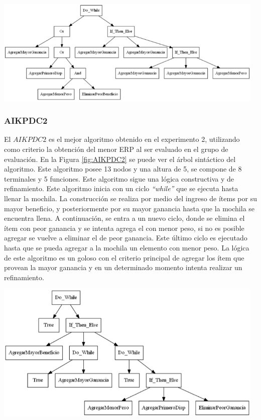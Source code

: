 \begingroup
    \centering
    \includegraphics[width=13cm]{images/cap6/ANKPNC4.png}
    \label{fig:ANKPNC4}
\endgroup

\subsubsection{AIKPDC2}

El $AIKPDC2$ es el mejor algoritmo obtenido en el experimento 2, utilizando como criterio la obtención del menor ERP al ser evaluado en el grupo de evaluación. En la Figura \ref{fig:AIKPDC2} se puede ver el árbol sintáctico del algoritmo. Este algoritmo posee 13 nodos y una altura de 5, se compone de 8 terminales y 5 funciones. Este algoritmo sigue una lógica constructiva y de refinamiento.
Este algoritmo inicia con un ciclo \textit{“while”} que se ejecuta hasta llenar la mochila. La construcción se realiza por medio del ingreso de ítems por su mayor beneficio, y posteriormente por su mayor ganancia hasta que la mochila se encuentra llena. A continuación, se entra a un nuevo ciclo, donde se elimina el ítem con peor ganancia y se intenta agrega el con menor peso, si no es posible agregar se vuelve a eliminar el de peor ganancia. Este último ciclo es ejecutado hasta que se pueda agregar a la mochila un elemento con menor peso. La lógica de este algoritmo es un goloso con el criterio principal de agregar los ítem que provean la mayor ganancia y en un determinado momento intenta realizar un refinamiento.

\begingroup
    \centering
    \includegraphics[width=13cm]{images/cap6/AIKPDC2.png}
    \label{fig:AIKPDC2}
\endgroup

